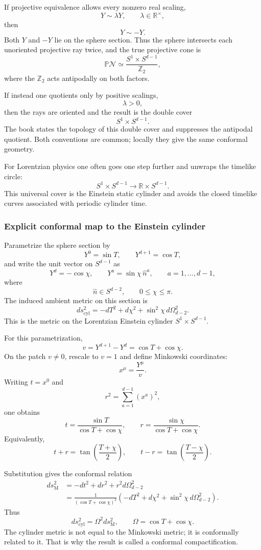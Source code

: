 \documentclass[
  10pt,
  a4paper,
  openany]{book}
\begin{document}
If projective equivalence allows every nonzero real scaling, \[
Y\sim\lambda Y,
\qquad
\lambda\in\mathbb R^\times,
\] then \[
Y\sim-Y.
\] Both \(Y\) and \(-Y\) lie on the sphere section. Thus the sphere
intersects each unoriented projective ray twice, and the true projective
cone is \[
\boxed{
\mathbb P\mathcal N
\simeq
\frac{S^1\times S^{d-1}}{\mathbb Z_2}
},
\] where the \(\mathbb Z_2\) acts antipodally on both factors.

If instead one quotients only by positive scalings, \[
\lambda>0,
\] then the rays are oriented and the result is the double cover \[
S^1\times S^{d-1}.
\] The book states the topology of this double cover and suppresses the
antipodal quotient. Both conventions are common; locally they give the
same conformal geometry.

For Lorentzian physics one often goes one step further and unwraps the
timelike circle: \[
S^1\times S^{d-1}
\longrightarrow
\mathbb R\times S^{d-1}.
\] This universal cover is the Einstein static cylinder and avoids the
closed timelike curves associated with periodic cylinder time.

\subsubsection{Explicit conformal map to the Einstein
cylinder}\label{explicit-conformal-map-to-the-einstein-cylinder}

Parametrize the sphere section by \[
Y^0=\sin T,
\qquad
Y^{d+1}=\cos T,
\] and write the unit vector on \(S^{d-1}\) as \[
Y^d=-\cos\chi,
\qquad
Y^a=\sin\chi\,\widehat n^a,
\qquad
a=1,\ldots,d-1,
\] where \[
\widehat n\in S^{d-2},
\qquad
0\leq\chi\leq\pi.
\] The induced ambient metric on this section is \[
\boxed{
ds_{\mathrm{cyl}}^2
=
-dT^2+d\chi^2
+\sin^2\chi\,d\Omega_{d-2}^2
}.
\] This is the metric on the Lorentzian Einstein cylinder
\(S^1\times S^{d-1}\).

For this parametrization, \[
v
=Y^{d+1}-Y^d
=\cos T+\cos\chi.
\] On the patch \(v\neq0\), rescale to \(v=1\) and define Minkowski
coordinates: \[
x^\mu=\frac{Y^\mu}{v}.
\] Writing \(t=x^0\) and \[
r^2=\sum_{a=1}^{d-1}(x^a)^2,
\] one obtains \[
\boxed{
t
=\frac{\sin T}{\cos T+\cos\chi},
\qquad
r
=\frac{\sin\chi}{\cos T+\cos\chi}
}.
\] Equivalently, \[
\boxed{
t+r
=\tan\left(\frac{T+\chi}{2}\right),
\qquad
t-r
=\tan\left(\frac{T-\chi}{2}\right)
}.
\]

Substitution gives the conformal relation \[
\begin{aligned}
ds_{\mathrm M}^2
&=
-dt^2+dr^2+r^2d\Omega_{d-2}^2\\
&=
\frac1{(\cos T+\cos\chi)^2}
\left(
-dT^2+d\chi^2
+\sin^2\chi\,d\Omega_{d-2}^2
\right).
\end{aligned}
\] Thus \[
\boxed{
ds_{\mathrm{cyl}}^2
=
\Omega^2ds_{\mathrm M}^2,
\qquad
\Omega=\cos T+\cos\chi
}.
\] The cylinder metric is not equal to the Minkowski metric; it is
conformally related to it. That is why the result is called a conformal
compactification.
\end{document}
